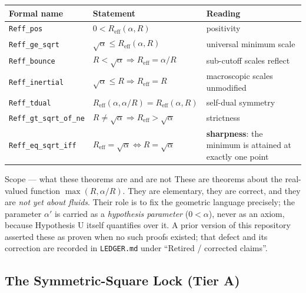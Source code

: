 \documentclass[11pt,a4paper]{article}
\newcommand{\tA}{\textcolor{TierA}{\textbf{Tier A}}}
\newcommand{\Reff}{R_{\mathrm{eff}}}
\theoremstyle{definition}
\theoremstyle{plain}
\begin{document}
\begin{center}
\begin{tabular}{@{}llp{7.4cm}@{}}
\toprule
\textbf{Formal name} & \textbf{Statement} & \textbf{Reading} \\
\midrule
\texttt{Reff\_pos}          & $0<\Reff(\alpha,R)$ & positivity \\
\texttt{Reff\_ge\_sqrt}     & $\sqrt{\alpha}\le \Reff(\alpha,R)$ & universal minimum scale \\
\texttt{Reff\_bounce}       & $R<\sqrt\alpha \Rightarrow \Reff=\alpha/R$ & sub-cutoff scales reflect \\
\texttt{Reff\_inertial}     & $\sqrt\alpha\le R \Rightarrow \Reff=R$ & macroscopic scales unmodified \\
\texttt{Reff\_tdual}        & $\Reff(\alpha,\alpha/R)=\Reff(\alpha,R)$ & self-dual symmetry \\
\texttt{Reff\_gt\_sqrt\_of\_ne} & $R\ne\sqrt\alpha \Rightarrow \Reff>\sqrt\alpha$ & strictness \\
\texttt{Reff\_eq\_sqrt\_iff}    & $\Reff=\sqrt\alpha \iff R=\sqrt\alpha$ & \textbf{sharpness}: the minimum is attained at exactly one point \\
\bottomrule
\end{tabular}
\end{center}

\begin{keybox}{Scope --- what these theorems are and are not}
These are theorems about the real-valued function $\max(R,\alpha/R)$. They are elementary,
they are correct, and they are \emph{not yet about fluids}. Their role is to fix the geometric
language precisely; the parameter $\alpha'$ is carried as a \emph{hypothesis parameter}
($0<\alpha$), never as an axiom, because Hypothesis U itself quantifies over it. A prior
version of this repository asserted these as proven when no such proofs existed; that defect
and its correction are recorded in \texttt{LEDGER.md} under ``Retired / corrected claims''.
\end{keybox}

\subsection{The Symmetric-Square Lock (\tA{})}
\end{document}
